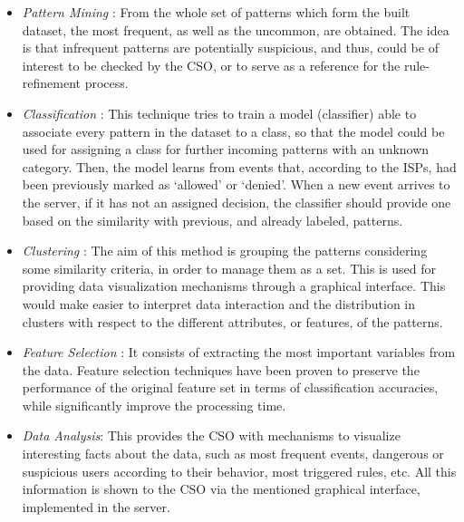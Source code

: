 \begin{itemize}

\item \textit{Pattern Mining} \cite{PatternMining_Han07}: 
From the whole set of patterns which form the built dataset, the most frequent, as well as the uncommon, are obtained. The idea is that infrequent patterns are potentially suspicious, and thus, could be of interest to be checked by the CSO, or to serve as a reference for the rule-refinement process.

\item \textit{Classification} \cite{classification_67}: 
This technique tries to train a model (classifier) able to associate every pattern in the dataset to a class, so that the model could be used for assigning a class for further incoming patterns with an unknown category.
Then, the model learns from events that, according to the ISPs, had been previously marked as `allowed' or `denied'. When a new event arrives to the server, if it has not an assigned decision, the classifier should provide one based on the similarity with previous, and already labeled, patterns.

\item \textit{Clustering} \cite{Clustering_Jain99}: 
The aim of this method is grouping the patterns considering some similarity criteria, in order to manage them as a set. This is used for providing data visualization mechanisms through a graphical interface. This would make easier to interpret data interaction and the distribution in clusters with respect to the different attributes, or features, of the patterns.

\item \textit{Feature Selection} \cite{FeatureSelection_Guyon03}: 
It consists of extracting the most important variables from the data. Feature selection techniques have been proven \cite{liu1998feature} to preserve the performance of the original feature set 
in terms of classification accuracies, while significantly improve the processing time.

\item \textit{Data Analysis}: 
This provides the CSO with mechanisms to visualize interesting facts about the data, such as most frequent events, dangerous or suspicious users according to their behavior, most triggered rules, etc. All this information is shown to the CSO via the mentioned graphical interface, implemented in the server.

\end{itemize}

